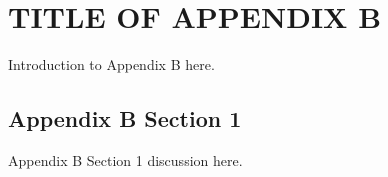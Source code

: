 \chapter{TITLE OF APPENDIX B} %
Introduction to Appendix B here.

\section{Appendix B Section 1}

Appendix B Section 1 discussion here.